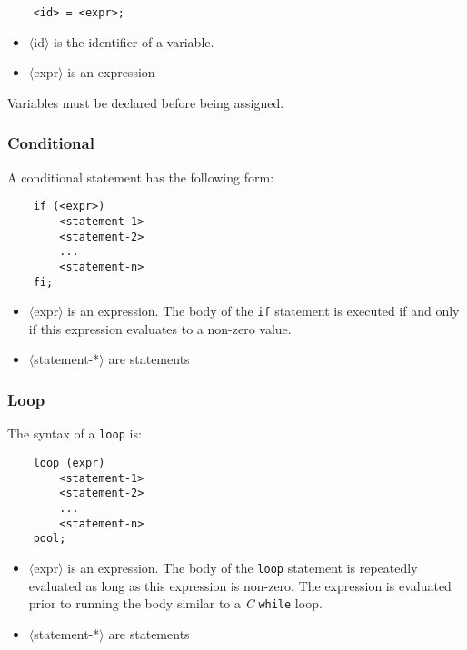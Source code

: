 \documentclass{article}
\newcommand{\code}[1]{\texttt{\textmd{#1}}}
\begin{document}
\begin{lstlisting}
	<id> = <expr>;
\end{lstlisting}

\begin{itemize}
	\item{$\langle$id$\rangle$} is the identifier of a variable.
	\item{$\langle$expr$\rangle$} is an expression
\end{itemize}

Variables must be declared before being assigned.


\subsubsection{Conditional}
\label{sssec:conditional}

A conditional statement has the following form:

\begin{lstlisting}
	if (<expr>)
		<statement-1>
		<statement-2>
		...
		<statement-n>
	fi;
\end{lstlisting}

\begin {itemize}
	\item{$\langle$expr$\rangle$} is an expression. The body of the \code{if} statement is executed if and only
	if this expression evaluates to a non-zero value.
	\item{$\langle$statement-*$\rangle$} are statements
\end{itemize}


\subsubsection{Loop}
\label{sssec:loop}

The syntax of a \code{loop} is:

\begin{lstlisting}
	loop (expr)
		<statement-1>
		<statement-2>
		...
		<statement-n>
	pool;
\end{lstlisting}

\begin {itemize}
	\item{$\langle$expr$\rangle$} is an expression. The body of the \texttt{loop} statement is repeatedly evaluated as long as
	this expression is non-zero. The expression is evaluated prior to running the body similar to a \textit{C} \texttt{while} loop.
	\item{$\langle$statement-*$\rangle$} are statements
\end{itemize}
\end{document}

